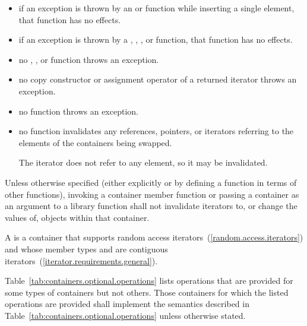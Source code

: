 \begin{itemize}
\item
if an exception is thrown by an
 or 
function while inserting a single element, that
function has no effects.
\item
if an exception is thrown by a
,
,
, or 
function, that function has no effects.
\item
no
,
,
or
function throws an exception.
\item
no copy constructor or assignment operator of a returned iterator
throws an exception.
\item
no
function throws an exception.
\item
no
function invalidates any references,
pointers, or iterators referring to the elements
of the containers being swapped. \begin{note} The  iterator does not refer to any element, so it may be invalidated. \end{note}
\end{itemize}

\pnum
Unless otherwise specified (either explicitly or by defining a
function in terms of other functions), invoking a container member
function or passing a container as an argument to a library function
shall not invalidate iterators to, or change the values of, objects
within that container.

\pnum
{}%
A 
is a container that supports random access iterators~(\ref{random.access.iterators})
and whose member types  and 
are contiguous iterators~(\ref{iterator.requirements.general}).

\pnum
Table~\ref{tab:containers.optional.operations} lists operations that are provided
for some types of containers but not others. Those containers for which the
listed operations are provided shall implement the semantics described in
Table~\ref{tab:containers.optional.operations} unless otherwise stated.


